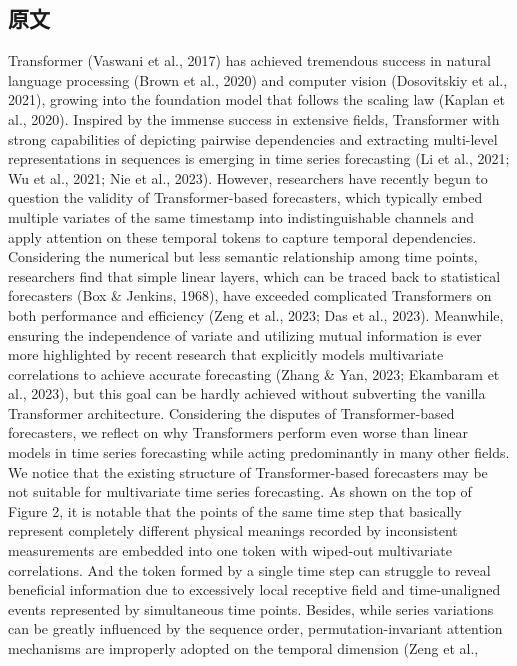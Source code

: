 \documentclass[twoside,12pt]{article}
\begin{document}
\subsection{原文}
Transformer (Vaswani et al., 2017) has achieved tremendous success in natural language processing (Brown et al., 2020) and computer vision (Dosovitskiy et al., 2021), growing into the foundation model that follows the scaling law (Kaplan et al., 2020). Inspired by the immense success in extensive
fields, Transformer with strong capabilities of depicting pairwise dependencies and extracting multi-level representations
in sequences is emerging in time series forecasting (Li et al.,
2021; Wu et al., 2021; Nie et al., 2023).
However, researchers have recently begun to question the validity of Transformer-based forecasters, which typically embed
multiple variates of the same timestamp into indistinguishable
channels and apply attention on these temporal tokens to capture temporal dependencies. Considering the numerical but
less semantic relationship among time points, researchers find
that simple linear layers, which can be traced back to statistical
forecasters (Box \& Jenkins, 1968), have exceeded complicated Transformers on both performance
and efficiency (Zeng et al., 2023; Das et al., 2023). Meanwhile, ensuring the independence of variate
and utilizing mutual information is ever more highlighted by recent research that explicitly models
multivariate correlations to achieve accurate forecasting (Zhang \& Yan, 2023; Ekambaram et al.,
2023), but this goal can be hardly achieved without subverting the vanilla Transformer architecture.
Considering the disputes of Transformer-based forecasters, we reflect on why Transformers perform
even worse than linear models in time series forecasting while acting predominantly in many other
fields. We notice that the existing structure of Transformer-based forecasters may be not suitable for
multivariate time series forecasting. As shown on the top of Figure 2, it is notable that the points
of the same time step that basically represent completely different physical meanings recorded by
inconsistent measurements are embedded into one token with wiped-out multivariate correlations.
And the token formed by a single time step can struggle to reveal beneficial information due to
excessively local receptive field and time-unaligned events represented by simultaneous time points.
Besides, while series variations can be greatly influenced by the sequence order, permutation-invariant attention mechanisms are improperly adopted on the temporal dimension (Zeng et al.,
\end{document}
